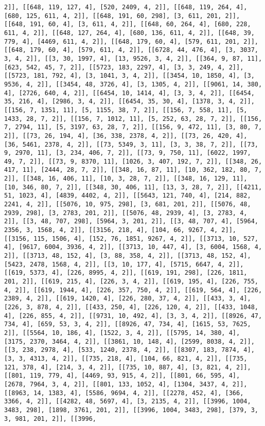 \documentclass[12pt,fleqn]{article}\usepackage{../../common}
\begin{document}
\begin{verbatim}
2]], [[648, 119, 127, 4], [520, 2409, 4, 2]], [[648, 119, 264, 4], [680, 125, 611, 4, 2]], [[648, 191, 60, 298], [3, 611, 201, 2]], [[648, 191, 60, 4], [3, 611, 4, 2]], [[648, 60, 264, 4], [680, 228, 611, 4, 2]], [[648, 127, 264, 4], [680, 136, 611, 4, 2]], [[648, 39, 779, 4], [4469, 611, 4, 2]], [[648, 179, 60, 4], [579, 611, 201, 2]], [[648, 179, 60, 4], [579, 611, 4, 2]], [[6728, 44, 476, 4], [3, 3037, 3, 4, 2]], [[3, 30, 1997, 4], [13, 9526, 3, 4, 2]], [[364, 9, 87, 11], [623, 542, 45, 7, 2]], [[5723, 183, 2297, 4], [3, 3, 249, 4, 2]], [[5723, 181, 792, 4], [3, 1041, 3, 4, 2]], [[3454, 10, 1850, 4], [3, 9536, 4, 2]], [[3454, 48, 3726, 4], [3, 1305, 4, 2]], [[9061, 14, 380, 4], [2726, 640, 4, 2]], [[6454, 10, 1414, 4], [3, 3, 4, 2]], [[6454, 35, 216, 4], [2986, 3, 4, 2]], [[6454, 35, 30, 4], [1378, 3, 4, 2]], [[156, 7, 1351, 11], [5, 1155, 38, 7, 2]], [[156, 7, 558, 11], [5, 1433, 28, 7, 2]], [[156, 7, 1012, 11], [5, 252, 63, 28, 7, 2]], [[156, 7, 2794, 11], [5, 3197, 63, 28, 7, 2]], [[156, 9, 472, 11], [3, 80, 7, 2]], [[73, 26, 194, 4], [36, 338, 2378, 4, 2]], [[73, 26, 420, 4], [36, 5461, 2378, 4, 2]], [[73, 5349, 3, 11], [3, 3, 38, 7, 2]], [[73, 9, 2970, 11], [3, 234, 406, 7, 2]], [[73, 9, 750, 11], [6022, 1997, 49, 7, 2]], [[73, 9, 8370, 11], [1026, 3, 407, 192, 7, 2]], [[348, 26, 417, 11], [2444, 28, 7, 2]], [[348, 16, 87, 11], [10, 362, 182, 80, 7, 2]], [[348, 16, 406, 11], [10, 3, 28, 7, 2]], [[348, 16, 129, 11], [10, 346, 80, 7, 2]], [[348, 30, 406, 11], [13, 3, 28, 7, 2]], [[4211, 51, 1023, 4], [4839, 4402, 4, 2]], [[5643, 121, 740, 4], [214, 882, 2241, 4, 2]], [[5076, 10, 975, 298], [3, 681, 201, 2]], [[5076, 48, 2939, 298], [3, 2783, 201, 2]], [[5076, 48, 2939, 4], [3, 2783, 4, 2]], [[3, 48, 707, 298], [5964, 3, 201, 2]], [[3, 48, 707, 4], [5964, 2356, 3, 1568, 4, 2]], [[3156, 218, 4], [104, 66, 9267, 4, 2]], [[3156, 115, 1506, 4], [152, 76, 1851, 9267, 4, 2]], [[3713, 10, 527, 4], [9617, 6004, 3936, 4, 2]], [[3713, 10, 447, 4], [3, 6004, 1568, 4, 2]], [[3713, 48, 152, 4], [3, 88, 358, 4, 2]], [[3713, 48, 152, 4], [5423, 2478, 1568, 4, 2]], [[3, 10, 177, 4], [5715, 6647, 4, 2]], [[619, 5373, 4], [226, 8995, 4, 2]], [[619, 191, 298], [226, 1811, 201, 2]], [[619, 215, 4], [226, 3, 4, 2]], [[619, 195, 4], [226, 755, 4, 2]], [[619, 1944, 4], [226, 357, 750, 4, 2]], [[619, 564, 4], [226, 2389, 4, 2]], [[619, 1420, 4], [226, 280, 37, 4, 2]], [[433, 3, 4], [226, 3, 878, 4, 2]], [[433, 250, 4], [226, 120, 4, 2]], [[433, 1048, 4], [226, 855, 4, 2]], [[9731, 10, 492, 4], [3, 3, 4, 2]], [[8926, 47, 734, 4], [659, 53, 3, 4, 2]], [[8926, 47, 734, 4], [1615, 53, 7625, 2]], [[5564, 10, 186, 4], [1522, 3, 4, 2]], [[5795, 14, 380, 4], [3175, 2370, 3464, 4, 2]], [[3861, 10, 148, 4], [2599, 8038, 4, 2]], [[3, 238, 2978, 4], [533, 1240, 2378, 4, 2]], [[8307, 183, 7874, 4], [3, 3, 4313, 4, 2]], [[735, 218, 4], [104, 66, 821, 4, 2]], [[735, 121, 378, 4], [214, 3, 4, 2]], [[735, 10, 887, 4], [3, 821, 4, 2]], [[801, 119, 779, 4], [4469, 93, 915, 4, 2]], [[801, 66, 595, 4], [2678, 7964, 3, 4, 2]], [[801, 133, 1052, 4], [1304, 3437, 4, 2]], [[8963, 14, 1383, 4], [5586, 9694, 4, 2]], [[2278, 452, 4], [366, 3366, 4, 2]], [[4282, 48, 5697, 4], [3, 2135, 4, 2]], [[3996, 1004, 3483, 298], [1898, 3761, 201, 2]], [[3996, 1004, 3483, 298], [379, 3, 3, 981, 201, 2]], [[3996, 
\end{verbatim}
\end{document}
